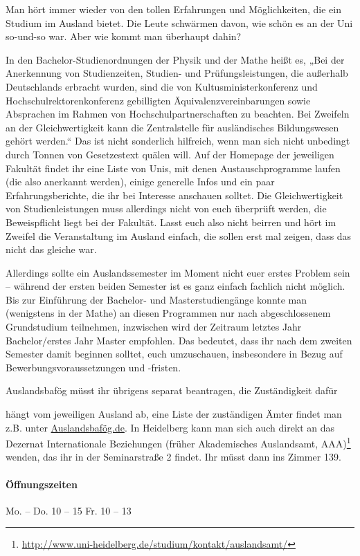 \newpage{}%
Man hört immer wieder von den tollen Erfahrungen und Möglichkeiten, die ein
Studium im Ausland bietet. Die Leute schwärmen davon, wie schön es an der Uni
so-und-so war. Aber wie kommt man überhaupt dahin?

In den Bachelor-Studienordnungen der Physik und der Mathe heißt es, „Bei der
Anerkennung von Studienzeiten, Studien- und Prüfungsleistungen, die außerhalb
Deutschlands erbracht wurden, sind die von Kultusministerkonferenz und
Hochschulrektorenkonferenz gebilligten Äquivalenzvereinbarungen sowie
Absprachen im Rahmen von Hochschulpartnerschaften zu beachten. Bei Zweifeln an
der Gleichwertigkeit kann die Zentralstelle für ausländisches Bildungswesen
gehört werden.“ Das ist nicht sonderlich hilfreich, wenn man sich nicht
unbedingt durch Tonnen von Gesetzestext quälen will. Auf der Homepage der
jeweiligen Fakultät findet ihr eine Liste von Unis, mit denen
Austauschprogramme laufen (die also anerkannt werden), einige generelle Infos
und ein paar Erfahrungsberichte, die ihr bei Interesse anschauen solltet.
Die Gleichwertigkeit von Studienleistungen muss allerdings nicht von euch 
überprüft werden, die Beweispflicht liegt bei der Fakultät. Lasst euch also 
nicht beirren und hört im Zweifel die Veranstaltung im Ausland einfach, die
sollen erst mal zeigen, dass das nicht das gleiche war.

Allerdings sollte ein Auslandssemester im Moment nicht euer erstes Problem
sein -- während der ersten beiden Semester ist es ganz einfach fachlich nicht
möglich. Bis zur Einführung der Bachelor- und Masterstudiengänge konnte man
(wenigstens in der Mathe) an diesen Programmen nur nach abgeschlossenem
Grundstudium teilnehmen, inzwischen wird der Zeitraum letztes Jahr
Bachelor/erstes Jahr Master empfohlen. Das bedeutet, dass ihr nach dem zweiten
Semester damit beginnen solltet, euch umzuschauen, insbesondere in Bezug auf
Bewerbungsvoraussetzungen und -fristen.

Auslandsbafög müsst ihr übrigens separat beantragen, die Zuständigkeit dafür

hängt vom jeweiligen Ausland ab, eine Liste der zuständigen Ämter findet man
z.B. unter \url{Auslandsbafög.de}. In Heidelberg kann man sich auch direkt
an das Dezernat Internationale Beziehungen (früher Akademisches Auslandsamt, AAA)\footnote{\url{http://www.uni-heidelberg.de/studium/kontakt/auslandsamt/}} wenden, das ihr in der Seminarstraße 2 findet. Ihr müsst dann ins Zimmer 139.

\paragraph{Öffnungszeiten} Mo. -- Do. 10 -- 15 \qquad Fr. 10 -- 13


